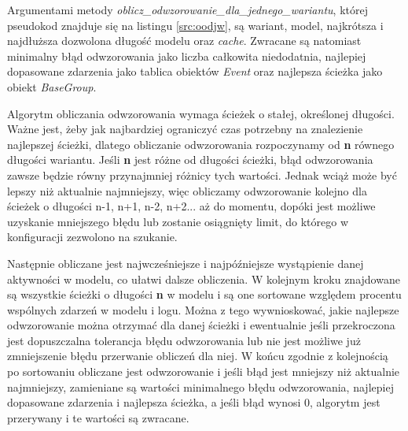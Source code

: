 Argumentami metody \textit{oblicz{\_}odwzorowanie{\_}dla{\_}jednego{\_}wariantu}, której pseudokod znajduje się na listingu \ref{src:oodjw}, są wariant, model, najkrótsza i najdłuższa dozwolona długość modelu oraz \textit{cache}. Zwracane są natomiast minimalny błąd odwzorowania jako liczba całkowita niedodatnia, najlepiej dopasowane zdarzenia jako tablica obiektów \textit{Event} oraz najlepsza ścieżka jako obiekt \textit{BaseGroup}.

Algorytm obliczania odwzorowania wymaga ścieżek o stałej, określonej długości. Ważne jest, żeby jak najbardziej ograniczyć czas potrzebny na znalezienie najlepszej ścieżki, dlatego obliczanie odwzorowania rozpoczynamy od \textbf{n} równego długości wariantu. Jeśli \textbf{n} jest różne od długości ścieżki, błąd odwzorowania zawsze będzie równy przynajmniej różnicy tych wartości. Jednak wciąż może być lepszy niż aktualnie najmniejszy, więc obliczamy odwzorowanie kolejno dla ścieżek o długości n-1, n+1, n-2, n+2... aż do momentu, dopóki jest możliwe uzyskanie mniejszego błędu lub zostanie osiągnięty limit, do którego w konfiguracji zezwolono na szukanie. 

Następnie obliczane jest najwcześniejsze i najpóźniejsze wystąpienie danej aktywności w modelu, co ułatwi dalsze obliczenia. W kolejnym kroku znajdowane są wszystkie ścieżki o długości \textbf{n} w modelu i są one sortowane względem procentu wspólnych zdarzeń w modelu i logu. Można z tego wywnioskować, jakie najlepsze odwzorowanie można otrzymać dla danej ścieżki i ewentualnie jeśli przekroczona jest dopuszczalna tolerancja błędu odwzorowania lub nie jest możliwe już zmniejszenie błędu przerwanie obliczeń dla niej. W końcu zgodnie z kolejnością po sortowaniu obliczane jest odwzorowanie i jeśli błąd jest mniejszy niż aktualnie najmniejszy, zamieniane są wartości minimalnego błędu odwzorowania, najlepiej dopasowane zdarzenia i najlepsza ścieżka, a jeśli błąd wynosi 0, algorytm jest przerywany i te wartości są zwracane.

